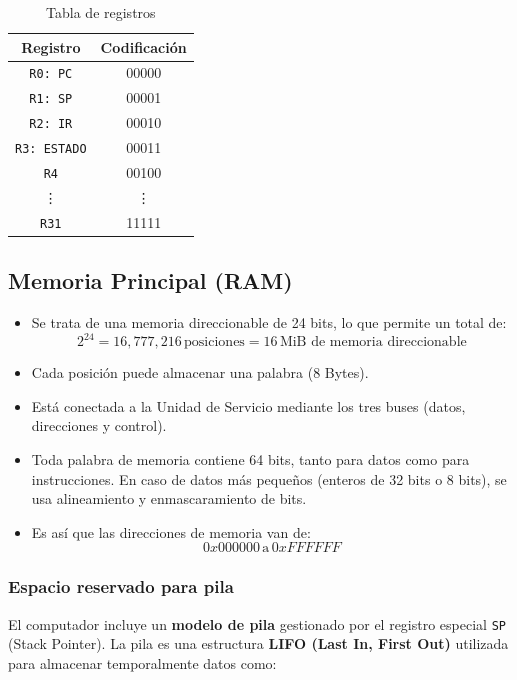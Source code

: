 \documentclass{article}
\begin{document}
\begin{table}[H]
    \centering
    \begin{tabular}{|c|c|}
    \hline
    \textbf{Registro} & \textbf{Codificación} \\
    \hline
    \texttt{R0: PC} & 00000 \\
    \texttt{R1: SP} & 00001 \\
    \texttt{R2: IR} & 00010 \\
    \texttt{R3: ESTADO} & 00011 \\
    \texttt{R4} & 00100 \\
    \vdots & \vdots \\
    \texttt{R31} & 11111 \\
    \hline
    \end{tabular}
    \caption{Tabla de registros}
\end{table}

\subsection{Memoria Principal (RAM)}

\begin{itemize}
    \item Se trata de una memoria direccionable de 24 bits, lo que permite un total de:
    \[
    2^{24} = 16,777,216 \, \text{posiciones} = 16 \, \text{MiB de memoria direccionable}
    \]
    \item Cada posición puede almacenar una palabra (8 Bytes).
    \item Está conectada a la Unidad de Servicio mediante los tres buses (datos, direcciones y control).
    \item Toda palabra de memoria contiene 64 bits, tanto para datos como para instrucciones. En caso de datos más pequeños (enteros de 32 bits o 8 bits), se usa alineamiento y enmascaramiento de bits.
    \item Es así que las direcciones de memoria van de:
    \[
    0x000000 \, \text{a} \, 0xFFFFFF
    \]
\end{itemize}

\subsubsection{Espacio reservado para pila}

El computador incluye un \textbf{modelo de pila} gestionado por el registro especial \texttt{SP} (Stack Pointer). La pila es una estructura \textbf{LIFO (Last In, First Out)} utilizada para almacenar temporalmente datos como:
\end{document}
